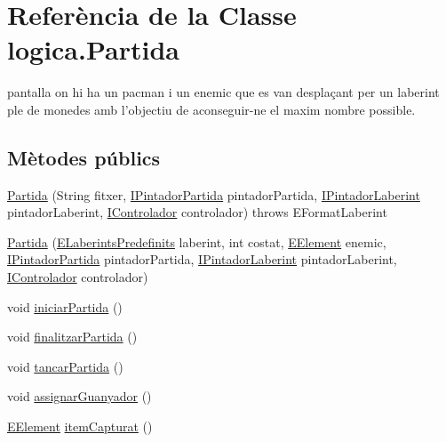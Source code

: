\hypertarget{classlogica_1_1_partida}{\section{Referència de la Classe logica.\+Partida}
\label{classlogica_1_1_partida}
}


pantalla on hi ha un pacman i un enemic que es van desplaçant per un laberint ple de monedes amb l'objectiu de aconseguir-\/ne el maxim nombre possible.  


\subsection*{Mètodes públics}
\begin{DoxyCompactItemize}
\item 
\hyperlink{classlogica_1_1_partida_ab85633f290087fe7699fe41008b2e93a}{Partida} (String fitxer, \hyperlink{interfaceinterficie_1_1_i_pintador_partida}{I\+Pintador\+Partida} pintador\+Partida, \hyperlink{interfaceinterficie_1_1_i_pintador_laberint}{I\+Pintador\+Laberint} pintador\+Laberint, \hyperlink{interfacelogica_1_1controladors__pacman_1_1_i_controlador}{I\+Controlador} controlador)  throws E\+Format\+Laberint
\item 
\hyperlink{classlogica_1_1_partida_a89b9872f1db2660c1c0587d48ccef48c}{Partida} (\hyperlink{enumlogica_1_1enumeracions_1_1_e_laberints_predefinits}{E\+Laberints\+Predefinits} laberint, int costat, \hyperlink{enumlogica_1_1enumeracions_1_1_e_element}{E\+Element} enemic, \hyperlink{interfaceinterficie_1_1_i_pintador_partida}{I\+Pintador\+Partida} pintador\+Partida, \hyperlink{interfaceinterficie_1_1_i_pintador_laberint}{I\+Pintador\+Laberint} pintador\+Laberint, \hyperlink{interfacelogica_1_1controladors__pacman_1_1_i_controlador}{I\+Controlador} controlador)
\item 
void \hyperlink{classlogica_1_1_partida_aa23f62dbeea7c44240304843e2ea699d}{iniciar\+Partida} ()
\item 
void \hyperlink{classlogica_1_1_partida_a44c3c25575052f971e90728f15f9c5a2}{finalitzar\+Partida} ()
\item 
void \hyperlink{classlogica_1_1_partida_add05723aee1bf8587d0021f96f372c51}{tancar\+Partida} ()
\item 
void \hyperlink{classlogica_1_1_partida_a29bd0292c22c67f4ada328373ec00d05}{assignar\+Guanyador} ()
\item 
\hyperlink{enumlogica_1_1enumeracions_1_1_e_element}{E\+Element} \hyperlink{classlogica_1_1_partida_a4f899f5e8cd1e5acc95321331aace206}{item\+Capturat} ()

\end{DoxyCompactItemize}
